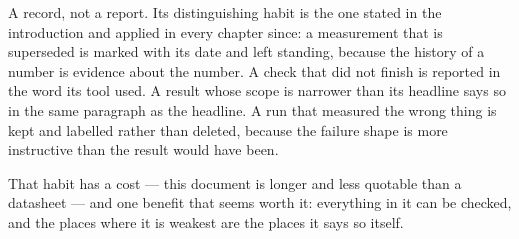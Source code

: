 A record, not a report. Its distinguishing habit is the one stated in
the introduction and applied in every chapter since: a measurement that
is superseded is marked with its date and left standing, because the
history of a number is evidence about the number. A check that did not
finish is reported in the word its tool used. A result whose scope is
narrower than its headline says so in the same paragraph as the
headline. A run that measured the wrong thing is kept and labelled
rather than deleted, because the failure shape is more instructive than
the result would have been.

That habit has a cost --- this document is longer and less quotable
than a datasheet --- and one benefit that seems worth it: everything in
it can be checked, and the places where it is weakest are the places it
says so itself.
